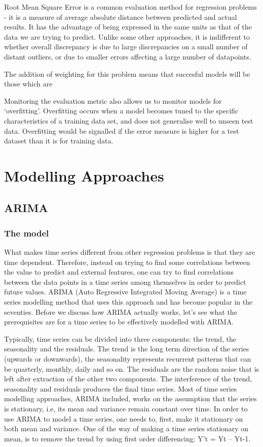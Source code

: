 \documentclass{article} %
\begin{document}
Root Mean Square Error is a common evaluation method for regression problems - it is a measure of average absolute distance between predicted and actual results.  It has the advantage of being expressed in the same units as that of the data we are trying to predict.  Unlike some other approaches, it is indifferent to whether overall discrepancy is due to large discrepancies on a small number of distant outliers, or due to smaller errors affecting a large number of datapoints.

The addition of weighting for this problem means that succesful models will be those which are 

Monitoring the evaluation metric also allows us to monitor models for `overfitting'.  Overfitting occurs when a model becomes tuned to the specific characteristics of a training data set, and does not generalise well to unseen test data. Overfitting would be signalled if the error measure is higher for a test dataset than it is for training data.

\section*{Modelling Approaches}

\subsection*{ARIMA}

\subsubsection*{The model}
What makes time series different from other regression problems is that they are time dependent. Therefore, instead on trying to find some correlations between the value to predict and external features, one can try to find correlations between the data points in a time series among themselves in order to predict future values. ARIMA (Auto Regressive Integrated Moving Average) is a time series modelling method that uses this approach and has become popular in the seventies.
Before we discuss how ARIMA actually works, let’s see what the prerequisites are for a time series to be effectively modelled with ARIMA.

Typically, time series can be divided into three components: the trend, the seasonality and the residuals. The trend is the long term direction of the series (upwards or downwards), the seasonality represents recurrent patterns that can be quarterly, monthly, daily and so on. The residuals are the random noise that is left after extraction of the other two components. The interference of the trend, seasonality and residuals produces the final time series.
Most of time series modelling approaches, ARIMA included, works on the assumption that the series is stationary, i.e, its mean and variance remain constant over time. In order to use ARIMA to model a time series, one needs to, first, make it stationary on both mean and variance.
One of the way of making a time series stationary on mean, is to remove the trend by using first order differencing: Y’t = Yt – Yt-1.
\end{document}
